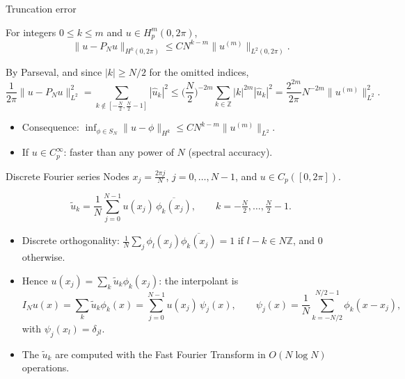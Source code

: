\begin{frame}{Truncation error}
    \begin{theorem}
        For integers $0 \le k \le m$ and $u \in H^m_p(0,2\pi)$,
        \[
            \|u - P_N u\|_{H^k(0,2\pi)} \le C N^{k-m} \|u^{(m)}\|_{L^2(0,2\pi)} .
        \]
    \end{theorem}
    \begin{proofsteps}[Proof for $k = 0$]
        By Parseval, and since $|k| \ge N/2$ for the omitted indices,
        \[
            \frac{1}{2\pi}\|u - P_N u\|^2_{L^2}
            = \sum_{k \notin [-\frac N2, \frac N2 - 1]} |\hat u_k|^2
            \le \Big(\frac N2\Big)^{-2m} \sum_{k \in \mathbb Z} |k|^{2m} |\hat u_k|^2
            = \frac{2^{2m}}{2\pi} N^{-2m} \|u^{(m)}\|^2_{L^2}.
        \]
    \end{proofsteps}
    \begin{itemize}
        \item Consequence: $\inf_{\phi \in S_N} \|u - \phi\|_{H^k} \le C N^{k-m} \|u^{(m)}\|_{L^2}$.
        \item If $u \in C^\infty_p$: faster than any power of $N$ (\alert{spectral accuracy}).
    \end{itemize}
\end{frame}

\begin{frame}{Discrete Fourier series}
    Nodes $x_j = \frac{2\pi j}{N}$, $j = 0, \dots, N-1$, and $u \in C_p([0,2\pi])$.
    \begin{definition}
        \[
            \tilde u_k = \frac 1N \sum_{j=0}^{N-1} u(x_j)\, \overline{\phi_k(x_j)}, \qquad k = -\tfrac N2, \dots, \tfrac N2 - 1.
        \]
    \end{definition}
    \begin{itemize}
        \item Discrete orthogonality: $\frac1N \sum_{j} \phi_l(x_j)\overline{\phi_k(x_j)} = 1$ if $l - k \in N\mathbb Z$, and $0$ otherwise.
        \item Hence $u(x_j) = \sum_k \tilde u_k \phi_k(x_j)$: the interpolant is
              \[
                  I_N u(x) = \sum_{k} \tilde u_k \phi_k(x) = \sum_{j=0}^{N-1} u(x_j)\, \psi_j(x),
                  \qquad
                  \psi_j(x) = \frac1N \sum_{k=-N/2}^{N/2-1} \phi_k(x - x_j),
              \]
              with $\psi_j(x_l) = \delta_{jl}$.
        \item The $\tilde u_k$ are computed with the Fast Fourier Transform in $O(N\log N)$ operations.
    \end{itemize}
\end{frame}

